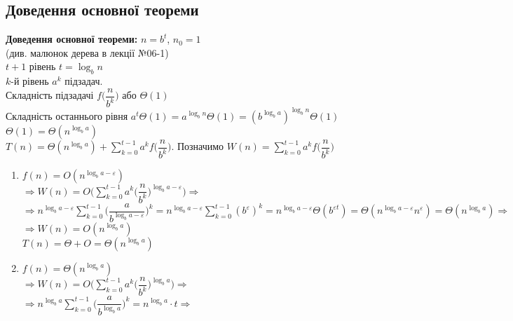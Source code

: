 \documentclass[a4paper,12pt]{article}
\newcommand{\dsum}{\displaystyle\sum}
\begin{document}
    \subsection{Доведення основної теореми}
    \textbf{Доведення основної теореми:} $n=b^t$, $n_0=1$ \\
    (див. малюнок дерева в лекції №06-1) \\
    $t+1$ рівень $t=\log_bn$ \\
    $k$-й рівень $a^k$ підзадач. \\
    Складність підзадачі $f\Biggl(\dfrac{n}{b^k}\Biggr)$ або $\Theta(1)$ \\
    Складність останнього рівня $a^t\Theta(1)=a^{\log_bn}\Theta(1)=(b^{\log_ba})^{\log_bn}\Theta(1)$ \\
    $\Theta(1)=\Theta(n^{\log_ba})$ \\
    $T(n)=\Theta(n^{\log_ba})+\dsum\limits_{k=0}^{t-1}a^kf\Biggl(\dfrac{n}{b^k}\Biggr)$. Позначимо $W(n)=\dsum\limits_{k=0}^{t-1}a^kf\Biggl(\dfrac{n}{b^k}\Biggr)$ \\
    \begin{enumerate}
        \item $f(n)=O(n^{\log_ba-\varepsilon})$ \\
        $\Rightarrow W(n)=O\Biggl(\dsum\limits_{k=0}^{t-1}a^k\Biggl(\dfrac{n}{b^k}\Biggr)^{\log_ba-\varepsilon}\Biggr) \Rightarrow$ \\
        $\Rightarrow n^{\log_ba-\varepsilon}\dsum\limits_{k=0}^{t-1}\Biggl(\dfrac{a}{b^{\log_ba-\varepsilon}}\Biggr)^k=n^{\log_ba-\varepsilon}\dsum\limits_{k=0}^{t-1}(b^\varepsilon)^k=n^{\log_ba-\varepsilon}\Theta(b^{\varepsilon t})=\Theta(n^{\log_ba-\varepsilon}n^\varepsilon)=\Theta(n^{\log_ba})\Rightarrow$ \\
        $\Rightarrow W(n)=O(n^{\log_ba})$ \\
        $T(n)=\Theta+O=\Theta(n^{\log_ba})$
        \item $f(n)=\Theta(n^{\log_ba})$ \\
        $\Rightarrow W(n)=O\Biggl(\dsum\limits_{k=0}^{t-1}a^k\Biggl(\dfrac{n}{b^k}\Biggr)^{\log_ba}\Biggr) \Rightarrow$ \\
        $\Rightarrow n^{\log_ba}\dsum\limits_{k=0}^{t-1}\Biggl(\dfrac{a}{b^{\log_ba}}\Biggr)^k=n^{\log_ba}\cdot t \Rightarrow$ 
    \end{enumerate}
\end{document}
